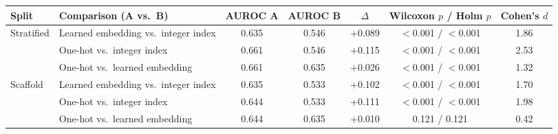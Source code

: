 \begin{tabular}{llccccc}
\toprule
Split & Comparison (A vs.\ B) & AUROC A & AUROC B & $\Delta$ & Wilcoxon $p$ / Holm $p$ & Cohen's $d$ \\
\midrule
Stratified & Learned embedding vs.\ integer index & 0.635 & 0.546 & +0.089 & $<$0.001 / $<$0.001 & 1.86 \\
 & One-hot vs.\ integer index & 0.661 & 0.546 & +0.115 & $<$0.001 / $<$0.001 & 2.53 \\
 & One-hot vs.\ learned embedding & 0.661 & 0.635 & +0.026 & $<$0.001 / $<$0.001 & 1.32 \\
\midrule
Scaffold & Learned embedding vs.\ integer index & 0.635 & 0.533 & +0.102 & $<$0.001 / $<$0.001 & 1.70 \\
 & One-hot vs.\ integer index & 0.644 & 0.533 & +0.111 & $<$0.001 / $<$0.001 & 1.98 \\
 & One-hot vs.\ learned embedding & 0.644 & 0.635 & +0.010 & 0.121 / 0.121 & 0.42 \\
\bottomrule
\end{tabular}